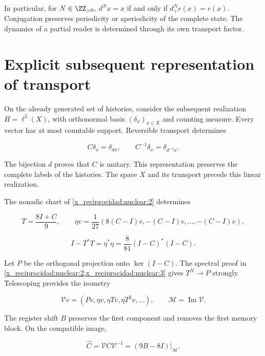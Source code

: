 In particular, for \(N\in\ZZ_{>0}\), \(d^Nx=x\) if and only if \(d_+^Nr(x)=r(x)\). Conjugation preserves periodicity or aperiodicity of the complete state. The dynamics of a partial reader is determined through its own transport factor.

\section{Explicit subsequent representation of transport}

On the already generated set of histories, consider the subsequent realization \(H=\ell^2(X)\), with orthonormal basis \((\delta_x)_{x\in X}\) and counting measure. Every vector has at most countable support. Reversible transport determines



\[
C\delta_x=\delta_{d x},\qquad C^{-1}\delta_x=\delta_{d^{-1}x}.
\]



The bijection \(d\) proves that \(C\) is unitary. This representation preserves the complete labels of the histories. The space \(X\) and its transport precede this linear realization.

The nonadic chart of \cref{x_reciprocidad:nuclear:2} determines



\[
T=\frac{8I+C}{9},\qquad
\eta v=\frac1{27}(8(C-I)v,-(C-I)v,\ldots,-(C-I)v),
\]





\[
I-T^*T=\eta^*\eta=\frac8{81}(I-C)^*(I-C).
\]



Let \(P\) be the orthogonal projection onto \(\ker(I-C)\). The spectral proof in \cref{x_reciprocidad:nuclear:2,x_reciprocidad:nuclear:3} gives \(T^N\to P\) strongly. Telescoping provides the isometry



\[
\mathcal Vv=(Pv,\eta v,\eta Tv,\eta T^2v,\ldots),\qquad
\mathcal M=\operatorname{Im}\mathcal V.
\]



The register shift \(B\) preserves the first component and removes the first memory block. On the compatible image,



\begin{equation}
\boxed{\widehat C=\mathcal VC\mathcal V^{-1}
=(9B-8I)|_{\mathcal M}.}
\label{x_reciprocidad:nuc09:transporte-recuperado}
\end{equation}



